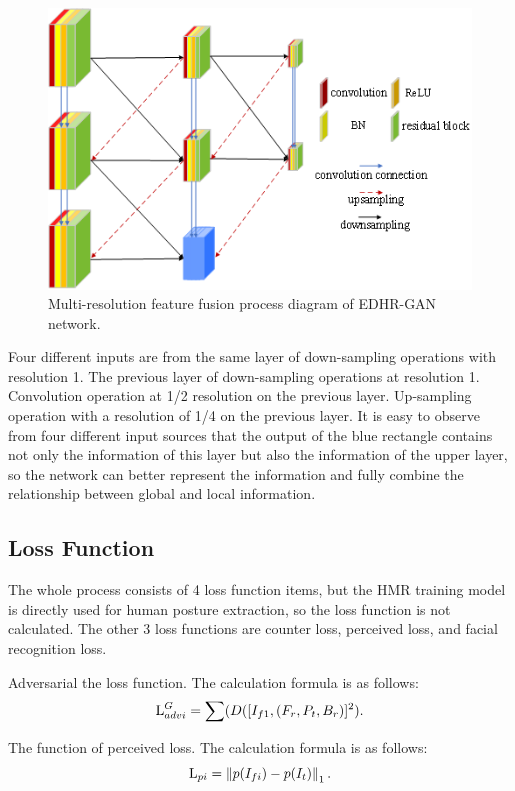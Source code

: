 	\begin{figure}
		\centering
		\includegraphics[scale=1]{image06.png}
		\caption{Multi-resolution feature fusion process diagram of EDHR-GAN network.}
		\label{image06}
	\end{figure}

Four different inputs are from the same layer of down-sampling operations with resolution 1. The previous layer of down-sampling operations at resolution 1. Convolution operation at 1/2 resolution on the previous layer. Up-sampling operation with a resolution of 1/4 on the previous layer. It is easy to observe from four different input sources that the output of the blue rectangle contains not only the information of this layer but also the information of the upper layer, so the network can better represent the information and fully combine the relationship between global and local information.
	
\subsection{Loss Function}
	
The whole process consists of 4 loss function items, but the HMR training model is directly used for human posture extraction, so the loss function is not calculated. The other 3 loss functions are counter loss, perceived loss, and facial recognition loss.
	
Adversarial the loss function. The calculation formula is as follows:
\begin{equation}
	\centering
	\text {L}_{advi}^{G} = \sum(D([I_{f1}, (F_{r}, P_{t}, B_{r})]^{2}).
\end{equation}

The function of perceived loss. The calculation formula is as follows:
\begin{equation}
	\centering
	\text {L}_{pi} = \left\|p(I_{fi}) - p(I_{t}) \right\|_{1} .
\end{equation}


